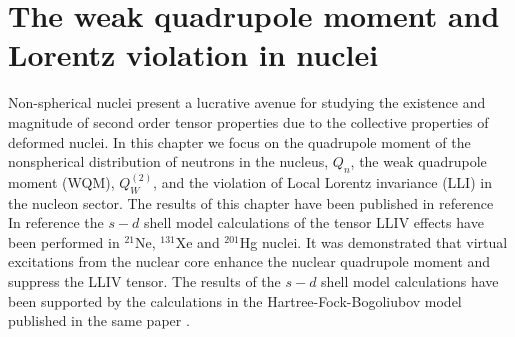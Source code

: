 \documentclass[10pt,a4paper, twoside]{report}
\begin{document}
\chapter{The weak quadrupole moment and Lorentz violation in nuclei} \label{chap:WQM}
Non-spherical nuclei present a lucrative avenue for studying the existence and magnitude of second order tensor properties due to the collective properties of deformed nuclei. In this chapter we focus on the quadrupole moment of the nonspherical  distribution of neutrons in the nucleus, $Q_{n}$,  the weak quadrupole moment (WQM), $Q_{W}^{(2)}$,  and the violation of Local Lorentz invariance (LLI) in the nucleon sector. The results of this chapter have been published in reference \cite{LFWQM2018} \\
\linebreak
In reference \cite{Brown2016} the $s-d$ shell model calculations of the tensor LLIV effects have been performed in $^{21}$Ne, $^{131}$Xe and $^{201}$Hg nuclei. It was demonstrated that virtual excitations from the nuclear core enhance the nuclear quadrupole moment and suppress the LLIV tensor.  The results of the $s-d$ shell model calculations have been supported by the calculations in the Hartree-Fock-Bogoliubov model published in the same paper \cite{Brown2016}.
\end{document}
